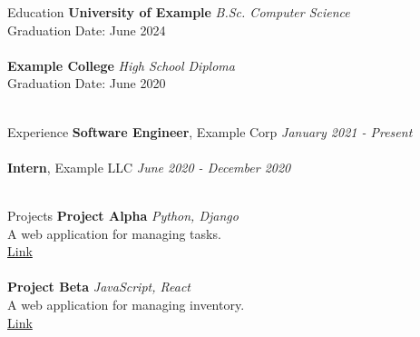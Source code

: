 \documentclass{resume} %
\begin{document}

\begin{rSection}{Education}
{\bf University of Example} \hfill {\em B.Sc. Computer Science} \\ 
Graduation Date: June 2024 \\ 
\\ 
{\bf Example College} \hfill {\em High School Diploma} \\ 
Graduation Date: June 2020 \\ 
\\ 

\end{rSection}

\begin{rSection}{Experience}
{\bf Software Engineer}, Example Corp \hfill {\em January 2021 - Present} \\ 
\\ 
{\bf Intern}, Example LLC \hfill {\em June 2020 - December 2020} \\ 
\\ 

\end{rSection}

\begin{rSection}{Projects}
{\bf Project Alpha} \hfill {\em Python, Django} \\ 
A web application for managing tasks. \\ 
\href{https://github.com/johndoe/project-alpha}{Link} \\ 
\\ 
{\bf Project Beta} \hfill {\em JavaScript, React} \\ 
A web application for managing inventory. \\ 
\href{https://github.com/johndoe/project-alpha}{Link} \\ 
\\ 

\end{rSection}
\end{document}
